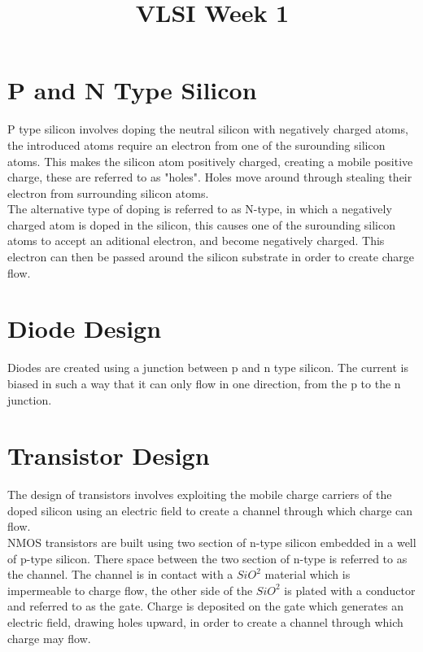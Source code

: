 \documentclass[•]{article}
\begin{document}
\title{VLSI Week 1}
\maketitle

\tableofcontents
\newpage

\section{P and N Type Silicon}
P type silicon involves doping the neutral silicon with negatively charged atoms, the introduced atoms require an electron from one of the surounding silicon atoms. This makes the silicon atom positively charged, creating a mobile positive charge, these are referred to as "holes". Holes move around through stealing their electron from surrounding silicon atoms. \\

The alternative type of doping is referred to as N-type, in which a negatively charged atom is doped in the silicon, this causes one of the surounding silicon atoms to accept an aditional electron, and become negatively charged. This electron can then be passed around the silicon substrate in order to create charge flow.

\section{Diode Design}
Diodes are created using a junction between p and n type silicon. The current is biased in such a way that it can only flow in one direction, from the p to the n junction.

\section{Transistor Design}
The design of transistors involves exploiting the mobile charge carriers of the doped silicon using an electric field to create a channel through which charge can flow. \\

NMOS transistors are built using two section of n-type silicon embedded in a well of p-type silicon. There space between the two section of n-type is referred to as the channel. The channel is in contact with a $SiO^2$ material which is impermeable to charge flow, the other side of the $SiO^2$ is plated with a conductor and referred to as the gate. Charge is deposited on the gate which generates an electric field, drawing holes upward, in order to create a channel through which charge may flow.
\end{document}
